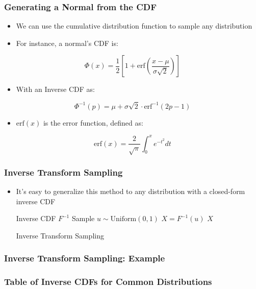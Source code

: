 \documentclass{beamer}
\begin{document}
\begin{frame}
\frametitle{Generating a Normal from the CDF}
\begin{itemize}
  \item We can use the cumulative distribution function to sample any distribution
  \item For instance, a normal's CDF is:
\end{itemize}
\begin{equation*}
  \Phi(x) = \frac{1}{2} \left[ 1 + \text{erf}\left( \frac{x - \mu}{\sigma \sqrt{2}} \right) \right]
\end{equation*}
\begin{itemize}
  \item With an Inverse CDF as:
\end{itemize}
\begin{equation*}
  \Phi^{-1}(p) = \mu + \sigma \sqrt{2} \cdot \text{erf}^{-1}\left( 2p - 1 \right)
\end{equation*}
\begin{itemize}
  \item $\text{erf}(x)$ is the error function, defined as:
\end{itemize}
\begin{equation*}
  \text{erf}(x) = \frac{2}{\sqrt{\pi}} \int^{x}_{0} e^{-t^2} dt
\end{equation*}
\end{frame}


\begin{frame}
\frametitle{Inverse Transform Sampling}
\begin{itemize}
  \item It's easy to generalize this method to any distribution with a closed-form inverse CDF
  \begin{algorithm}[H]
  \begin{algorithmic}[1]
    \REQUIRE Inverse CDF $F^{-1}$
    \STATE Sample $u \sim \text{Uniform}(0, 1)$
    \STATE $X = F^{-1} (u)$
    \ENSURE $X$
  \end{algorithmic}
  \caption{Inverse Transform Sampling}
  \end{algorithm}
\end{itemize}

\end{frame}


\begin{frame}
\frametitle{Inverse Transform Sampling: Example}
\end{frame}


\begin{frame}
\frametitle{Table of Inverse CDFs for Common Distributions}
\end{frame}
\end{document}
